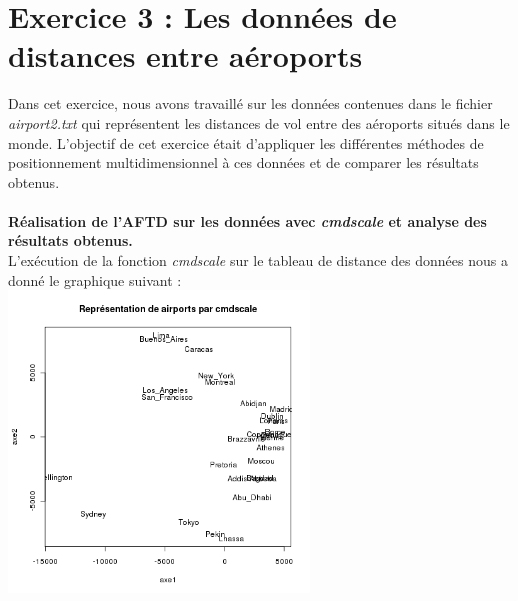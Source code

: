 \documentclass[a4paper, 10pt]{article}
\begin{document}
\section*{Exercice 3 : Les données de distances entre aéroports}
Dans cet exercice, nous avons travaillé sur les données contenues dans le fichier \textit{airport2.txt} qui représentent les distances de vol
entre des aéroports situés dans le monde. L'objectif de cet exercice était d'appliquer les différentes méthodes
de positionnement multidimensionnel à ces données et de comparer les résultats obtenus.\\ \\
\textbf{Réalisation de l'AFTD sur les données avec \textit{cmdscale} et analyse des résultats obtenus.}\\
L'exécution de la fonction \textit{cmdscale} sur le tableau de distance des données nous a donné le graphique suivant :\\
\includegraphics[height = 8cm, width = 8cm]{plots/plot_airports_cmdscale.png}\\
\end{document}

